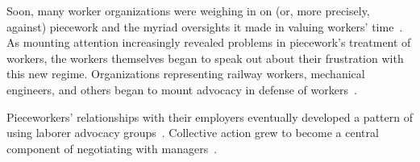\documentclass[trackingWork]{subfiles}
\begin{document}
Soon, many worker organizations were weighing in on (or, more precisely, against) piecework and the myriad oversights it made in valuing workers' time~\cite{american1921problem,richards1904anything}.
As mounting attention increasingly revealed problems in piecework's treatment of workers, the workers themselves began to speak out about their frustration with this new regime.
Organizations representing railway workers, mechanical engineers, and others began to mount advocacy in defense of workers~\cite{american1921problem,richards1904anything}.



Pieceworkers' relationships with their employers eventually developed a pattern of using 
laborer advocacy groups~\cite{levi2009union,ahlquist2013interest,
      mccallum2013global,jacoby1983union}.
Collective action grew to become a central component of negotiating with managers~\cite{russell1982collective,olsonlogic}.
\end{document}
